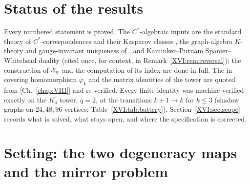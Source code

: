 \section*{Status of the results}

Every numbered statement is proved. The $C^*$-algebraic inputs are the standard theory of
$C^*$-correspondences and their Kasparov classes \cite{Kas,Bla}, the graph-algebra
$K$-theory and gauge-invariant uniqueness of \cite{R}, and Kaminker--Putnam
Spanier--Whitehead duality \cite{KP} (cited once, for context, in
Remark~\ref{XVI:rem:reversal}); the construction of $\mathcal{X}_\eta$ and the computation of its index
are done in full. The in-covering homomorphism $\varphi_k$ and the matrix identities of
the tower are quoted from [Ch.~\ref{chap:VIII}] and re-verified. Every finite identity was
machine-verified exactly on the $K_4$ tower, $q=2$, at the transitions
$k+1\to k$ for $k\le3$ (shadow graphs on $24,48,96$ vertices; Table~\ref{XVI:tab:battery}).
Section~\ref{XVI:sec:scope} records what is solved, what stays open, and where the
specification is corrected.

\section{Setting: the two degeneracy maps and the mirror problem}\label{XVI:sec:setting}

